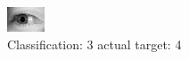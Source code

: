 \begin{figure}[h!]
\begin{center}
\includegraphics[width=0.60\columnwidth]{figures/ID3132_class_3_target_4.png}
\end{center}
\caption{ Classification: 3 actual target: 4}
\label{fig:ID3132_class_3_target_4}
\end{figure}
